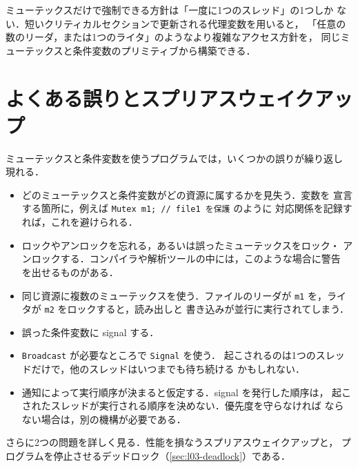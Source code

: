 \documentclass[../main.tex]{subfiles}
\begin{document}
\begin{keypoint}
  ミューテックスだけで強制できる方針は「一度に1つのスレッド」の1つしか
  ない．短いクリティカルセクションで更新される代理変数を用いると，
  「任意の数のリーダ，または1つのライタ」のようなより複雑なアクセス方針を，
  同じミューテックスと条件変数のプリミティブから構築できる．
\end{keypoint}

\section{よくある誤りとスプリアスウェイクアップ}
\label{sec:l03-pitfalls}

ミューテックスと条件変数を使うプログラムでは，いくつかの誤りが繰り返し
現れる．
\begin{itemize}
  \item どのミューテックスと条件変数がどの資源に属するかを見失う．変数を
    宣言する箇所に，例えば \texttt{Mutex m1; // file1 を保護} のように
    対応関係を記録すれば，これを避けられる．
  \item ロックやアンロックを忘れる，あるいは誤ったミューテックスをロック・
    アンロックする．コンパイラや解析ツールの中には，このような場合に警告
    を出せるものがある．
  \item 同じ資源に複数のミューテックスを使う．ファイルのリーダが
    \texttt{m1} を，ライタが \texttt{m2} をロックすると，読み出しと
    書き込みが並行に実行されてしまう．
  \item 誤った条件変数に signal する．
  \item \texttt{Broadcast} が必要なところで \texttt{Signal} を使う．
    起こされるのは1つのスレッドだけで，他のスレッドはいつまでも待ち続ける
    かもしれない．
  \item 通知によって実行順序が決まると仮定する．signal を発行した順序は，
    起こされたスレッドが実行される順序を決めない．優先度を守らなければ
    ならない場合は，別の機構が必要である．
\end{itemize}

さらに2つの問題を詳しく見る．性能を損なうスプリアスウェイクアップと，
プログラムを停止させるデッドロック（\cref{sec:l03-deadlock}）である．
\end{document}
